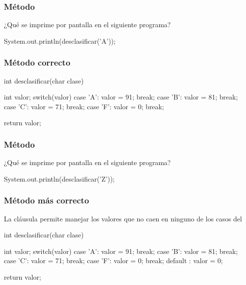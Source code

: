 \documentclass{beamer}
\begin{document}
\begin{frame}[fragile]
  \frametitle{Método }

  ¿Qué se imprime por pantalla en el siguiente programa?
  
\begin{jsmall}
    System.out.println(desclasificar('A'));
\end{jsmall}
\end{frame}

\begin{frame}[fragile]
  \frametitle{Método  correcto}
\begin{jsmall}
    int desclasificar(char clase) {
      int valor;
      switch(valor) {
        case 'A': valor = 91; break;
        case 'B': valor = 81; break;
        case 'C': valor = 71; break;
        case 'F': valor = 0;  break;
      }

      return valor;
    }    
\end{jsmall}
\end{frame}

\begin{frame}[fragile]
  \frametitle{Método }

  ¿Qué se imprime por pantalla en el siguiente programa?
  
\begin{jsmall}
    System.out.println(desclasificar('Z'));
\end{jsmall}
\end{frame}

\begin{frame}[fragile]
  \frametitle{Método  más correcto}
  La cláusula  permite manejar los valores que no caen
  en ninguno de los casos del 
  
\begin{jsmall}
    int desclasificar(char clase) {
      int valor;
      switch(valor) {
        case 'A': valor = 91; break;
        case 'B': valor = 81; break;
        case 'C': valor = 71; break;
        case 'F': valor = 0;  break;
        default : valor = 0;
      }

      return valor;
    }    
\end{jsmall}
\end{frame}
\end{document}
